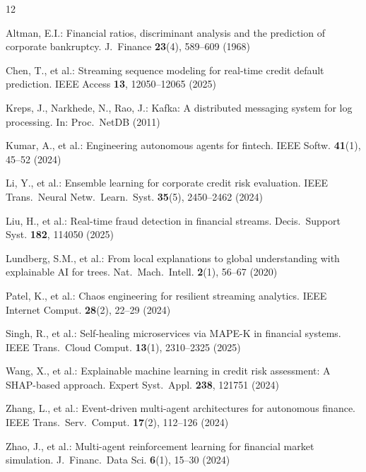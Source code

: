 \documentclass[runningheads]{llncs}
\begin{document}
\begin{thebibliography}{12}

Altman, E.I.: Financial ratios, discriminant analysis and the prediction of corporate bankruptcy. J.~Finance \textbf{23}(4), 589--609 (1968)

Chen, T., et al.: Streaming sequence modeling for real-time credit default prediction. IEEE Access \textbf{13}, 12050--12065 (2025)

Kreps, J., Narkhede, N., Rao, J.: Kafka: A distributed messaging system for log processing. In: Proc.~NetDB (2011)

Kumar, A., et al.: Engineering autonomous agents for fintech. IEEE Softw. \textbf{41}(1), 45--52 (2024)

Li, Y., et al.: Ensemble learning for corporate credit risk evaluation. IEEE Trans.~Neural Netw.~Learn.~Syst. \textbf{35}(5), 2450--2462 (2024)

Liu, H., et al.: Real-time fraud detection in financial streams. Decis.~Support Syst. \textbf{182}, 114050 (2025)

Lundberg, S.M., et al.: From local explanations to global understanding with explainable AI for trees. Nat.~Mach.~Intell. \textbf{2}(1), 56--67 (2020)

Patel, K., et al.: Chaos engineering for resilient streaming analytics. IEEE Internet Comput. \textbf{28}(2), 22--29 (2024)

Singh, R., et al.: Self-healing microservices via MAPE-K in financial systems. IEEE Trans.~Cloud Comput. \textbf{13}(1), 2310--2325 (2025)

Wang, X., et al.: Explainable machine learning in credit risk assessment: A SHAP-based approach. Expert Syst.~Appl. \textbf{238}, 121751 (2024)

Zhang, L., et al.: Event-driven multi-agent architectures for autonomous finance. IEEE Trans.~Serv.~Comput. \textbf{17}(2), 112--126 (2024)

Zhao, J., et al.: Multi-agent reinforcement learning for financial market simulation. J.~Financ.~Data Sci. \textbf{6}(1), 15--30 (2024)

\end{thebibliography}
\end{document}

